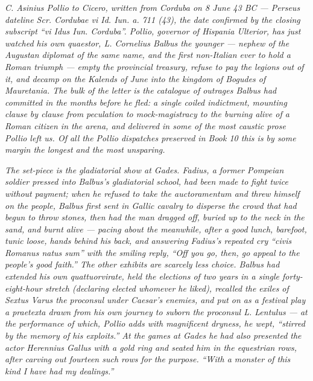 
\textit{C. Asinius Pollio to Cicero, written from Corduba
on 8 June 43 BC --- Perseus dateline \textit{Scr. Cordubae
vi Id. Iun. a. 711 (43)}, the date confirmed by the
closing subscript ``\textit{vi Idus Iun. Corduba}''. Pollio,
governor of Hispania Ulterior, has just watched his own
quaestor, L. Cornelius Balbus the younger --- nephew of
the Augustan diplomat of the same name, and the first
non-Italian ever to hold a Roman triumph --- empty the
provincial treasury, refuse to pay the legions out of it,
and decamp on the Kalends of June into the kingdom of
Bogudes of Mauretania. The bulk of the letter is the
catalogue of outrages Balbus had committed in the months
before he fled: a single coiled indictment, mounting
clause by clause from peculation to mock-magistracy to
the burning alive of a Roman citizen in the arena, and
delivered in some of the most caustic prose Pollio left
us. Of all the Pollio dispatches preserved in Book 10
this is by some margin the longest and the most
unsparing.}

\textit{The set-piece is the gladiatorial show at Gades.
Fadius, a former Pompeian soldier pressed into Balbus's
gladiatorial school, had been made to fight twice
without payment; when he refused to take the
\textit{auctoramentum} and threw himself on the
people, Balbus first sent in Gallic cavalry to disperse
the crowd that had begun to throw stones, then had the
man dragged off, buried up to the neck in the sand, and
burnt alive --- pacing about the meanwhile, after a good
lunch, barefoot, tunic loose, hands behind his back, and
answering Fadius's repeated cry ``\textit{civis Romanus
natus sum}'' with the smiling reply, ``Off you go, then,
go appeal to the people's good faith.'' The other
exhibits are scarcely less choice. Balbus had extended
his own quattuorvirate, held the elections of two years
in a single forty-eight-hour stretch (declaring elected
whomever he liked), recalled the exiles of Sextus Varus
the proconsul under Caesar's enemies, and put on as a
festival play a \textit{praetexta} drawn from his own
journey to suborn the proconsul L. Lentulus --- at the
performance of which, Pollio adds with magnificent dryness,
he wept, ``stirred by the memory of his exploits.'' At
the games at Gades he had also presented the actor
Herennius Gallus with a gold ring and seated him in the
equestrian rows, after carving out fourteen such rows for
the purpose. ``With a monster of this kind I have had my
dealings.''}

